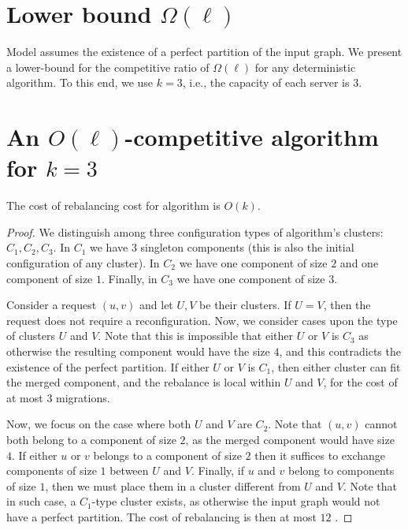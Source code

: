 \section{Lower bound $\Omega(\ell)$}

Model assumes the existence of a perfect partition of the input graph.
We present a lower-bound for the competitive ratio of $\Omega(\ell)$ for any deterministic algorithm.
To this end, we use $k = 3$, i.e., the capacity of each server is $3$.

\section{An $O(\ell)$-competitive algorithm for $k=3$}

\begin{theorem}
  The cost of rebalancing cost for algorithm is $O(k)$.
  \label{rebalancing-cost}
\end{theorem}

\begin{proof}
  
  We distinguish among three configuration types of algorithm's clusters: $C_1, C_2, C_3$. In $C_1$ we have $3$ singleton components (this is also the initial configuration of any cluster). In $C_2$ we have one component of size $2$ and one component of size $1$. Finally, in $C_3$ we have one component of size $3$.

  Consider a request $(u, v)$ and let $U, V$ be their clusters.
  If $U=V$, then the request does not require a reconfiguration.
  Now, we consider cases upon the type of clusters $U$ and $V$.
  Note that this is impossible that either $U$ or $V$ is $C_3$ as otherwise the resulting component would have the size $4$, and this contradicts the existence of the perfect partition.
  If either $U$ or $V$ is $C_1$, then either cluster can fit the merged component, and the rebalance is local within $U$ and $V$, for the cost of at most $3$ migrations.

  Now, we focus on the case where both $U$ and $V$ are $C_2$. Note that $(u,v)$ cannot both belong to a component of size $2$, as the merged component would have size $4$.
  If either $u$ or $v$ belongs to a component of size $2$ then it suffices to exchange components of size $1$ between $U$ and $V$.
  Finally, if $u$ and $v$ belong to components of size $1$, then we must place them in a cluster different from $U$ and $V$.
  Note that in such case, a $C_1$-type cluster exists, as otherwise the input graph would not have a perfect partition. The cost of rebalancing is then at most $12$ .
\end{proof}

